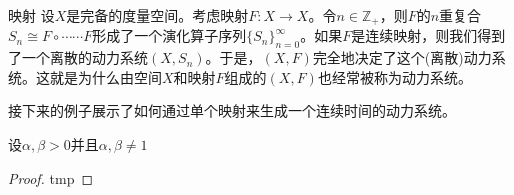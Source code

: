 \begin{example}{映射}
	设$X$是完备的度量空间。考虑映射$F:X\to X$。令$n\in\mathbb{Z}_{+}$，则$F$的$n$重复合$S_{n}\cong F\circ\cdots\cdots F$形成了一个演化算子序列$\{S_{n}\}_{n=0}^{\infty}$。如果$F$是连续映射，则我们得到了一个离散的动力系统$(X,S_{n})$。于是，$(X,F)$完全地决定了这个(离散)动力系统。这就是为什么由空间$X$和映射$F$组成的$(X,F)$也经常被称为动力系统。
\end{example}

接下来的例子展示了如何通过单个映射来生成一个连续时间的动力系统。

\begin{exercise}
设$\alpha,\beta>0$并且$\alpha,\beta\neq 1$

\end{exercise}

\begin{proof}
	tmp
\end{proof}

